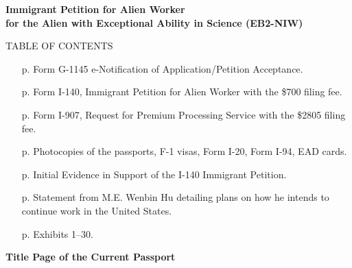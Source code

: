\documentclass{article}
\begin{document}

\vspace*{\fill}
\begin{center}

{\bf 
Immigrant Petition for Alien Worker\\
for the Alien with Exceptional Ability in Science (EB2-NIW)
}

\end{center}
\vspace*{\fill}

\begin{center}
TABLE OF CONTENTS
\end{center}
\begin{itemize}
    \item [p. \pageref*{G-1145}] Form G-1145 e-Notification of Application/Petition Acceptance. 
    \item [p. \pageref*{I-140}] Form I-140, Immigrant Petition for Alien Worker with the \$700 filing fee.
    \item [p. \pageref*{I-907}] Form I-907, Request for Premium Processing Service with the \$2805 filing fee.
    \item [p. \pageref*{docs}] Photocopies of the passports, F-1 visas, Form I-20, Form I-94, EAD cards.
    \item [p. \pageref*{IE}] Initial Evidence in Support of the I-140 Immigrant Petition.
    \item [p. \pageref*{plans}] Statement from M.E. Wenbin Hu detailing plans on how he intends to continue work in the United States.
    \item [p. \pageref*{exhib}] Exhibits 1–30.
\end{itemize}

\clearpage
\label{G-1145}


\label{I-140}


\label{I-907}


\vspace*{\fill}
\begin{center}

{\LARGE \bf
Title Page of the Current Passport
}
\label{docs}
\end{center}
\vspace*{\fill}
\end{document}
